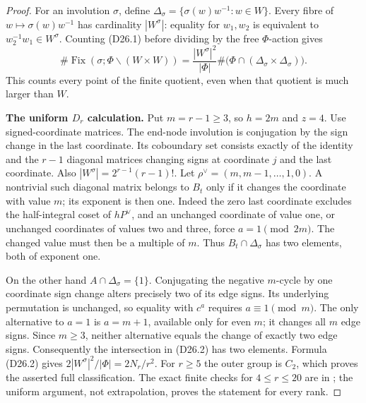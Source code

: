 \begin{proof}
For an involution $\sigma$, define
$\Delta_\sigma=\{\sigma(w)w^{-1}:w\in W\}$.
Every fibre of $w\mapsto\sigma(w)w^{-1}$ has cardinality
$|W^\sigma|$: equality for $w_1,w_2$ is equivalent to
$w_2^{-1}w_1\in W^\sigma$.
Counting (D26.1) before dividing by the free $\Phi$-action gives
\[
 \#\operatorname{Fix}(\sigma;\Phi\backslash(W\times W))
 =\frac{|W^\sigma|^2}{|\Phi|}
   \#\bigl(\Phi\cap(\Delta_\sigma\times\Delta_\sigma)\bigr).
                                                               \tag{D26.2}
\]
This counts every point of the finite quotient, even when that
quotient is much larger than $W$.

\medskip\noindent\textbf{The uniform $D_r$ calculation.}
Put $m=r-1\ge3$, so $h=2m$ and $z=4$.
Use signed-coordinate matrices.  The end-node involution is
conjugation by the sign change in the last coordinate.
Its coboundary set consists exactly of the identity and the
$r-1$ diagonal matrices changing signs at coordinate $j$ and
the last coordinate.  Also
$|W^\sigma|=2^{r-1}(r-1)!$.
Let $\rho^\vee=(m,m-1,\ldots,1,0)$.
A nontrivial such diagonal matrix belongs to $B_t$ only if
it changes the coordinate with value $m$; its exponent is then one.
Indeed the zero last coordinate excludes the half-integral
coset of $hP^\vee$, and an unchanged coordinate of value one,
or unchanged coordinates of values two and three, force
$a=1\pmod {2m}$.  The changed value must then be a multiple of $m$.
Thus $B_t\cap\Delta_\sigma$ has two elements, both of exponent one.

On the other hand $A\cap\Delta_\sigma=\{1\}$.
Conjugating the negative $m$-cycle by one coordinate sign change
alters precisely two of its edge signs.  Its underlying permutation
is unchanged, so equality with $c^a$ requires $a\equiv1\pmod m$.
The only alternative to $a=1$ is $a=m+1$, available only for even
$m$; it changes all $m$ edge signs.  Since $m\ge3$, neither
alternative equals the change of exactly two edge signs.
Consequently the intersection in (D26.2) has two elements.
Formula (D26.2) gives
$2|W^\sigma|^2/|\Phi|=2N_r/r^2$.
For $r\ge5$ the outer group is $C_2$, which proves the asserted
full classification.  The exact finite checks for $4\le r\le20$
are in ; the uniform argument,
not extrapolation, proves the statement for every rank.


\end{proof}
